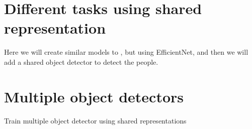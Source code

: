 \section{Different tasks using shared representation}
Here we will create similar models to \citep{visualPerson}, but using EfficientNet, and then we will add a shared object detector to detect the people.

\section{Multiple object detectors}
Train multiple object detector using shared representations

